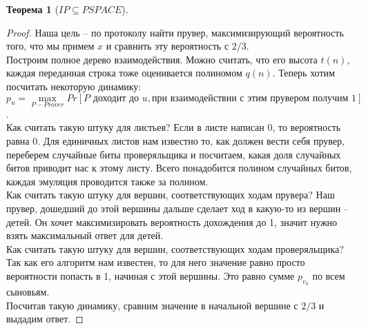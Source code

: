 \documentclass[12pt, letterpaper]{article}
\newtheorem{theorem}{Теорема}[section]
\begin{document}
\begin{theorem}[$IP \subseteq PSPACE$]
\end{theorem}
\begin{proof}
Наша цель -- по протоколу найти прувер, максимизирующий вероятность того, что мы примем $x$ и сравнить эту вероятность с $2/3$.\\
Построим полное дерево взаимодействия. Можно считать, что его высота $t(n)$, каждая переданная строка тоже оценивается полиномом $q(n)$. Теперь хотим посчитать некоторую динамику: $$p_u = \max_{P - Prover} Pr[P\text{ доходит до } u, \text{при взаимодействии с этим прувером получим 1}]$$.\\
Как считать такую штуку для листьев? Если в листе написан 0, то вероятность равна 0. Для единичных листов нам известно то, как должен вести себя прувер, переберем случайные биты проверяльщика и посчитаем, какая доля случайных битов приводит нас к этому листу. Всего понадобится полином случайных битов, каждая эмуляция проводится также за полином. \\
Как считать такую штуку для вершин, соответствующих ходам прувера? Наш прувер, дошедший до этой вершины дальше сделает ход в какую-то из вершин -- детей. Он хочет максимизировать вероятность дохождения до 1, значит нужно взять максимальный ответ для детей. \\
Как считать такую штуку для вершин, соответствующих ходам проверяльщика? Так как его алгоритм нам известен, то для него значение равно просто вероятности попасть в 1, начиная с этой вершины. Это равно сумме $p_{v_k}$ по всем сыновьям.\\
Посчитав такую динамику, сравним значение в начальной вершине с $2/3$ и выдадим ответ.
\end{proof}
\end{document}
